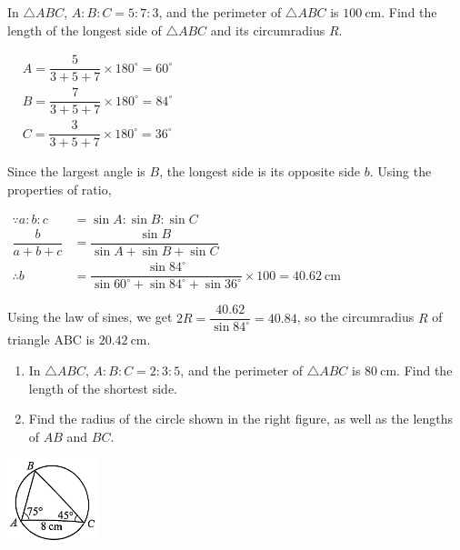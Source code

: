\documentclass{report}
\begin{document}
    \begin{question}
        In $\triangle ABC$, $A: B: C=5: 7: 3$, and the perimeter of $\triangle ABC$ is $100 \mathrm{~cm}$. Find the length of the longest side of $\triangle ABC$ and its circumradius $R$.

        \sol{}
        
        \noindent $\begin{aligned} & A=\dfrac{5}{3+5+7} \times 180^{\circ}=60^{\circ} \\ & B=\dfrac{7}{3+5+7} \times 180^{\circ}=84^{\circ} \\ & C=\dfrac{3}{3+5+7} \times 180^{\circ}=36^{\circ}\end{aligned}$

        \noindent Since the largest angle is $B$, the longest side is its opposite side $b$. Using the properties of ratio,
        
        \noindent $\begin{aligned} \because a: b: c & =\sin A: \sin B: \sin C \\ \dfrac{b}{a+b+c} & =\dfrac{\sin B}{\sin A+\sin B+\sin C} \\ \therefore b & =\dfrac{\sin 84^{\circ}}{\sin 60^{\circ}+\sin 84^{\circ}+\sin 36^{\circ}} \times 100=40.62 \mathrm{~cm}\end{aligned}$

        \noindent Using the law of sines, we get $2R=\dfrac{40.62}{\sin 84^\circ}=40.84$, so the circumradius $R$ of triangle ABC is $20.42 \mathrm{~cm}$.
    \end{question}

    \begin{vwcol}[widths={0.75,0.25}, sep=8mm, rule=0pt]
        \parbox{0.7\textwidth}{
            \begin{enumerate}
                \item In $\triangle ABC$, $A: B: C=2: 3: 5$, and the perimeter of $\triangle ABC$ is $80 \mathrm{~cm}$. Find the length of the shortest side.
        
                \item Find the radius of the circle shown in the right figure, as well as the lengths of $AB$ and $BC$.
            \end{enumerate}
        }

        \includegraphics[width=0.2\textwidth]{assets/10-13.jpg}
    \end{vwcol}
    \vspace{-2em}
\end{document}

